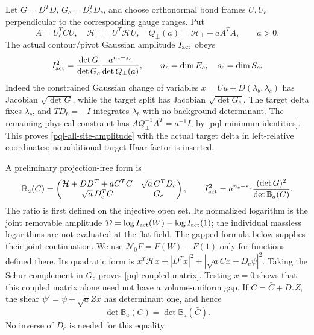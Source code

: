 Let $G=D^TD$, $G_c=D_c^TD_c$, and choose orthonormal bond frames
$U,U_c$ perpendicular to the corresponding gauge ranges. Put
\begin{equation}
 A=U_c^TCU,\quad \mathcal H_\perp=U^T\mathcal H U,\quad
 Q_\perp(a)=\mathcal H_\perp+aA^TA,\qquad a>0.
 \label{pql-physical-auxiliary}
\end{equation}
The actual contour/pivot Gaussian amplitude $I_{\rm act}$ obeys
\begin{equation}
 I_{\rm act}^2
 =\frac{\det G}{\det G_c}
   \frac{a^{n_c-s_c}}{\det Q_\perp(a)},\qquad
 n_c=\dim E_c,\quad s_c=\dim S_c.
 \label{pql-all-site-amplitude}
\end{equation}
Indeed the constrained Gaussian change of variables
$x=Uu+D(\lambda_b,\lambda_c)$ has Jacobian $\sqrt{\det G}$,
while the target split has Jacobian $\sqrt{\det G_c}$.
The target delta fixes $\lambda_c$, and $TD_b=-I$ integrates
$\lambda_b$ with no background determinant. The remaining physical
constraint has $AQ_\perp^{-1}A^T=a^{-1}I$, by
\eqref{pql-minimum-identities}. This proves
\eqref{pql-all-site-amplitude} with the actual target delta in
left-relative coordinates; no additional target Haar factor is inserted.

A preliminary projection-free form is
\begin{equation}
 \mathbb B_a(C)=
 \begin{pmatrix}
 \mathcal H+DD^T+aC^TC&\sqrt a\,C^TD_c\\
 \sqrt a\,D_c^TC&G_c
 \end{pmatrix},\qquad
 I_{\rm act}^2=a^{n_c-s_c}
                   \frac{(\det G)^2}{\det\mathbb B_a(C)}.
 \label{pql-coupled-matrix}
\end{equation}
The ratio is first defined on the injective open set. Its normalized
logarithm is the joint removable amplitude
$\mathcal D=\log I_{\rm act}(W)-\log I_{\rm act}(1)$; the individual
massless logarithms are not evaluated at the flat field. The gapped
formula below supplies their joint continuation. We use
$\mathcal N_0F=F(W)-F(1)$ only for functions defined there.
Its quadratic form is
$x^T\mathcal Hx+|D^Tx|^2+|\sqrt a Cx+D_c\psi|^2$.
Taking the Schur complement in $G_c$ proves
\eqref{pql-coupled-matrix}. Testing $x=0$ shows that this coupled
matrix alone need not have a volume-uniform gap.
If $C=\bar C+D_cZ$, the shear
$\psi'=\psi+\sqrt a Zx$ has determinant one, and hence
\begin{equation}
 \det\mathbb B_a(C)=\det\mathbb B_a(\bar C).
 \label{pql-shear}
\end{equation}
No inverse of $D_c$ is needed for this equality.

